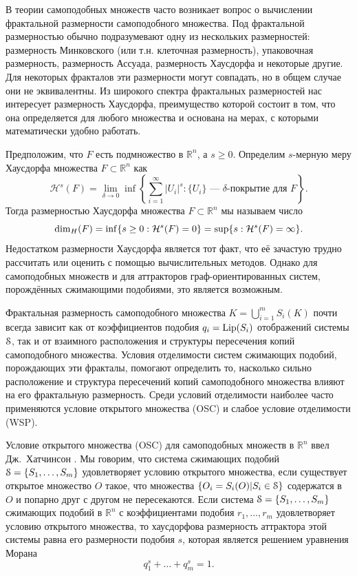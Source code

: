 \documentclass[a4paper,14pt]{extarticle} %
\newcommand{\eS}{\EuScript{S}}
\newcommand{\cH}{\mathcal{H}}
\newcommand{\IN}{\subset}
\newcommand{\rr}{\mathbb{R}}
\newcommand{\0}{\varnothing}
\newcommand{\8}{\infty}
\def \sup  {\mathop{\rm sup}  \nolimits}
\def \Lip  {\mathop{\rm Lip}  \nolimits}
\theoremstyle{definition}
\begin{document}
В теории самоподобных множеств часто возникает вопрос о вычислении фрактальной размерности самоподобного множества.
Под фрактальной размерностью обычно подразумевают одну из нескольких размерностей: размерность Минковского (или т.н. клеточная размерность), упаковочная размерность, размерность Ассуада, размерность Хаусдорфа и некоторые другие.
Для некоторых фракталов эти размерности могут совпадать, но в общем случае они не эквивалентны.
Из широкого спектра фрактальных размерностей нас интересует размерность Хаусдорфа, преимущество которой состоит в том, что она определяется для любого множества и основана на мерах, с которыми математически удобно работать.

Предположим, что $F$ есть подмножество в $\rr^n$, а $s\geq0$.
Определим  $s$-мерную меру Хаусдорфа множества $F\IN\rr^n$ как
\begin{equation}\label{eq:3_1}
    \cH^s(F)=\lim_{\delta\to0}\inf\left\{\sum_{i=1}^\8|U_i|^s : \{U_i\} \text{ --- $\delta$-покрытие для } F\right\}.
\end{equation}
Тогда размерностью Хаусдорфа множества $F\IN\rr^n$ мы называем число
\begin{equation}
    \dim_H(F)=\inf\{s\geq0 : \cH^s(F)=0\}=\sup\{s :\cH^s(F)=\8\}.
\end{equation}
Недостатком размерности Хаусдорфа является тот факт, что её зачастую трудно рассчитать или оценить с помощью вычислительных методов.
Однако для самоподобных множеств и для аттракторов граф-ориентированных систем, порождённых сжимающими подобиями, это является возможным.

Фрактальная размерность самоподобного множества $K=\bigcup_{i=1}^mS_i(K)$ почти всегда зависит как от коэффициентов подобия $q_i=\Lip(S_i)$ отображений системы $\eS$, так и от взаимного расположения и структуры пересечения копий самоподобного множества.
Условия отделимости систем сжимающих подобий, порождающих эти фракталы, помогают определить то, насколько  сильно расположение и  структура пересечений копий самоподобного множества влияют на его фрактальную размерность.
Среди условий отделимости наиболее часто применяются условие открытого множества (OSC) и слабое условие отделимости (WSP).

Условие открытого множества (OSC) для самоподобных множеств в $\rr^n$ ввел Дж.~Хатчинсон \cite{Hut1981}.
Мы говорим, что система сжимающих подобий $\eS=\{S_1, \ldots, S_m\}$ удовлетворяет условию открытого множества, если существует открытое множество $O$ такое, что множества $\{O_i=S_i(O) | S_i\in\eS\}$ содержатся в $O$ и попарно друг с другом не пересекаются.
Если система $\eS=\{S_1,\ldots,S_m\}$ сжимающих подобий в $\rr^n$ с коэффициентами подобия $r_1, \ldots, r_m$ удовлетворяет условию открытого множества, то хаусдорфова размерность аттрактора этой системы равна его размерности подобия $s$, которая является решением уравнения Морана 
$$q_1^s+\ldots+q_m^s=1.$$ 
\end{document}
